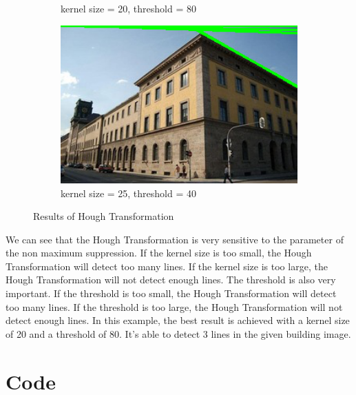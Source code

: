 \documentclass[12pt
,headinclude
,headsepline
,bibtotocnumbered
]{scrartcl}
\begin{document}
\begin{figure}[H]
\begin{subfigure}{0.45\textwidth}
        \caption*{kernel size = 20, threshold = 80}
    \end{subfigure}
    \hfill
    \begin{subfigure}{0.45\textwidth}
        \includegraphics[width=1\textwidth]{plots/houghlines_25_40.png}
        \caption*{kernel size = 25, threshold = 40}
    \end{subfigure}
    \caption{Results of Hough Transformation}
    \label{fig:5}
\end{figure}
We can see that the Hough Transformation is very sensitive to the parameter of the non maximum suppression. If the kernel size is too small, the Hough Transformation will detect too many lines. If the kernel size is too large, the Hough Transformation will not detect enough lines. The threshold is also very important. If the threshold is too small, the Hough Transformation will detect too many lines. If the threshold is too large, the Hough Transformation will not detect enough lines. In this example, the best result is achieved with a kernel size of 20 and a threshold of 80. It's able to detect 3 lines in the given building image. 
\newpage
\section*{Code}



\end{document}
